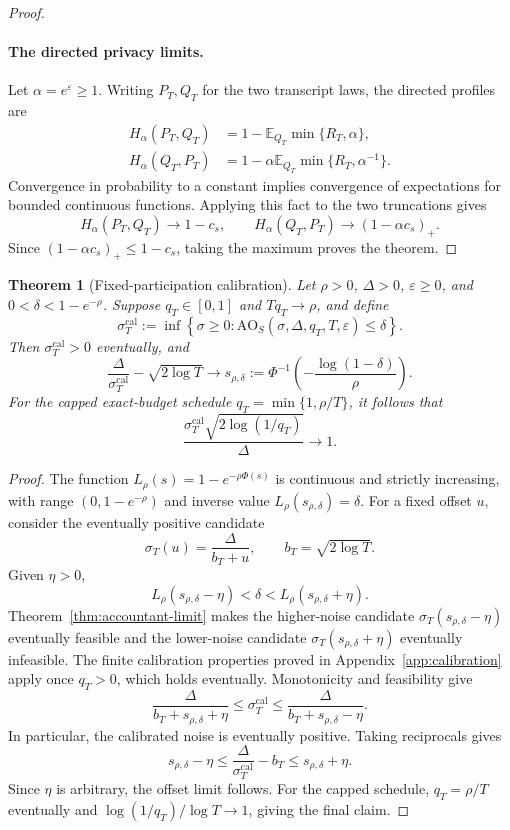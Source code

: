\documentclass[11pt]{article}
\newtheorem{theorem}{Theorem}[section]
\theoremstyle{remark}
\newcommand{\E}{\mathbb E}
\newcommand{\AO}{\mathrm{AO}}
\begin{document}
\begin{proof}
\paragraph{The directed privacy limits.}
Let $\alpha=e^\varepsilon\geq1$. Writing $P_T,Q_T$ for the two transcript
laws, the directed profiles are
\begin{align*}
 H_\alpha(P_T, Q_T)&=1-\E_{Q_T}\min\{R_T,\alpha\},\\
 H_\alpha(Q_T, P_T)&=1-\alpha\E_{Q_T}\min\{R_T,\alpha^{-1}\}.
\end{align*}
Convergence in probability to a constant implies convergence of expectations
for bounded continuous functions. Applying this fact to the two truncations
gives
\[
 H_\alpha(P_T, Q_T)\to1-c_s,\qquad
 H_\alpha(Q_T, P_T)\to(1-\alpha c_s)_+.
\]
Since $(1-\alpha c_s)_+\leq1-c_s$, taking the maximum proves the theorem.
\end{proof}

\begin{theorem}[Fixed-participation calibration]
\label{thm:fixed-participation-calibration}
Let $\rho>0$, $\Delta>0$, $\varepsilon\geq0$, and
$0<\delta<1-e^{-\rho}$. Suppose $q_T\in[0,1]$ and $Tq_T\to\rho$, and define
\[
 \sigma_T^{\mathrm{cal}}:=\inf\left\{\sigma\geq0:
 \AO_S(\sigma,\Delta,q_T,T,\varepsilon)\leq\delta\right\}.
\]
Then $\sigma_T^{\mathrm{cal}}>0$ eventually, and
\[
 \frac{\Delta}{\sigma_T^{\mathrm{cal}}}-\sqrt{2\log T}
 \longrightarrow s_{\rho,\delta}:=
 \Phi^{-1}\!\left(-\frac{\log(1-\delta)}\rho\right).
\]
For the capped exact-budget schedule $q_T=\min\{1,\rho/T\}$, it follows that
\[
 \frac{\sigma_T^{\mathrm{cal}}\sqrt{2\log(1/q_T)}}\Delta\longrightarrow1.
\]
\end{theorem}

\begin{proof}
The function $L_\rho(s)=1-e^{-\rho\Phi(s)}$ is continuous and strictly
increasing, with range $(0,1-e^{-\rho})$ and inverse value
$L_\rho(s_{\rho,\delta})=\delta$. For a fixed offset $u$, consider the
eventually positive candidate
\[
 \sigma_T(u)=\frac\Delta{b_T+u},\qquad b_T=\sqrt{2\log T}.
\]
Given $\eta>0$,
\[
 L_\rho(s_{\rho,\delta}-\eta)<\delta
 <L_\rho(s_{\rho,\delta}+\eta).
\]
Theorem~\ref{thm:accountant-limit} makes the higher-noise candidate
$\sigma_T(s_{\rho,\delta}-\eta)$ eventually feasible and the lower-noise
candidate $\sigma_T(s_{\rho,\delta}+\eta)$ eventually infeasible.
The finite calibration properties proved in Appendix~\ref{app:calibration}
apply once $q_T>0$, which holds eventually. Monotonicity and feasibility give
\[
 \frac\Delta{b_T+s_{\rho,\delta}+\eta}
 \leq\sigma_T^{\mathrm{cal}}
 \leq\frac\Delta{b_T+s_{\rho,\delta}-\eta}.
\]
In particular, the calibrated noise is eventually positive. Taking
reciprocals gives
\[
 s_{\rho,\delta}-\eta
 \leq\frac\Delta{\sigma_T^{\mathrm{cal}}}-b_T
 \leq s_{\rho,\delta}+\eta.
\]
Since $\eta$ is arbitrary, the offset limit follows. For the capped schedule,
$q_T=\rho/T$ eventually and $\log(1/q_T)/\log T\to1$, giving the final claim.
\end{proof}
\end{document}
